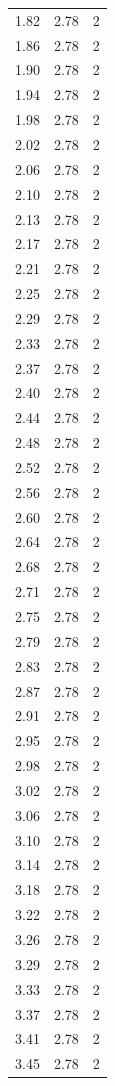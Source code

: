 \begin{longtable}{lrr}
  1.82 & 2.78 & 2 \\
  1.86 & 2.78 & 2 \\
  1.90 & 2.78 & 2 \\
  1.94 & 2.78 & 2 \\
  1.98 & 2.78 & 2 \\
  2.02 & 2.78 & 2 \\
  2.06 & 2.78 & 2 \\
  2.10 & 2.78 & 2 \\
  2.13 & 2.78 & 2 \\
  2.17 & 2.78 & 2 \\
  2.21 & 2.78 & 2 \\
  2.25 & 2.78 & 2 \\
  2.29 & 2.78 & 2 \\
  2.33 & 2.78 & 2 \\
  2.37 & 2.78 & 2 \\
  2.40 & 2.78 & 2 \\
  2.44 & 2.78 & 2 \\
  2.48 & 2.78 & 2 \\
  2.52 & 2.78 & 2 \\
  2.56 & 2.78 & 2 \\
  2.60 & 2.78 & 2 \\
  2.64 & 2.78 & 2 \\
  2.68 & 2.78 & 2 \\
  2.71 & 2.78 & 2 \\
  2.75 & 2.78 & 2 \\
  2.79 & 2.78 & 2 \\
  2.83 & 2.78 & 2 \\
  2.87 & 2.78 & 2 \\
  2.91 & 2.78 & 2 \\
  2.95 & 2.78 & 2 \\
  2.98 & 2.78 & 2 \\
  3.02 & 2.78 & 2 \\
  3.06 & 2.78 & 2 \\
  3.10 & 2.78 & 2 \\
  3.14 & 2.78 & 2 \\
  3.18 & 2.78 & 2 \\
  3.22 & 2.78 & 2 \\
  3.26 & 2.78 & 2 \\
  3.29 & 2.78 & 2 \\
  3.33 & 2.78 & 2 \\
  3.37 & 2.78 & 2 \\
  3.41 & 2.78 & 2 \\
  3.45 & 2.78 & 2 \\

\end{longtable}
